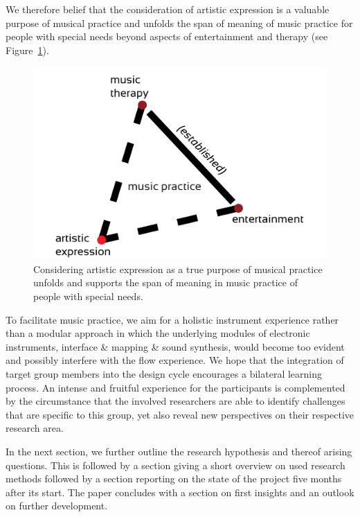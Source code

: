 \documentclass{chi-ext}
\begin{document}
\begin{multicols}{2}
We therefore belief that the consideration of artistic expression is a valuable purpose of musical practice and unfolds the span of meaning of music practice for people with special needs beyond aspects of entertainment and therapy (see Figure~\ref{fig:media_musicThreefold}).

\begin{figure}
	\includegraphics[width=\columnwidth]{media/musicThreefold.pdf}
	\caption{Considering artistic expression as a true purpose of musical practice unfolds and supports the span of meaning in music practice of people with special needs.}
	\label{fig:media_musicThreefold}
\end{figure}


To facilitate music practice, we aim for a holistic instrument experience rather than a modular approach in which the underlying modules of electronic instruments, interface \& mapping \& sound synthesis, would become too evident and possibly interfere with the flow experience. 
We hope that the integration of target group members into the design cycle encourages a bilateral learning process.
An intense and fruitful experience for the participants is complemented by the circumstance that the involved researchers are able to identify challenges that are specific to this group, yet also reveal new perspectives on their respective research area.

In the next section, we further outline the research hypothesis and thereof arising questions. 
This is followed by a section giving a short overview on used research methods followed by a section reporting on the state of the project five months after its start.
The paper concludes with a section on first insights and an outlook on further development.


\end{multicols}
\end{document}
